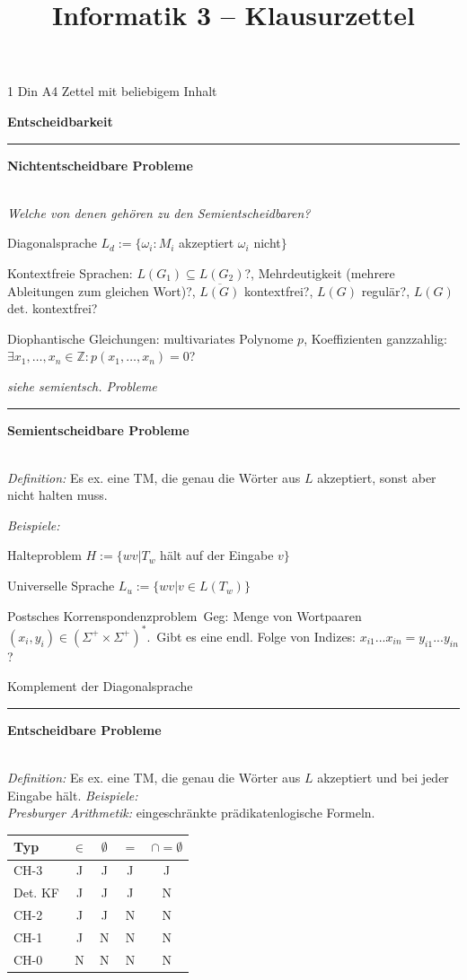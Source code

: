 \documentclass{article}
\title{Informatik 3 -- Klausurzettel}
\newcommand{\h}[1]{\vspace{1ex}\begin{center}\small\textbf{#1}\end{center}}
\newcommand{\hh}[1]{{\vspace{1pt}\hrule\vspace{1pt} \noindent\textbf{#1}}\\}
\newcommand{\hhh}[1]{{\vspace{1pt}\noindent\emph{#1:}}}
\newenvironment{tightlist}{
\begin{list}{\textbullet}{
\setlength{\topsep}{-1ex}
\setlength{\itemsep}{-1ex}
\setlength{\leftmargin}{4ex}
}
}{
\end{list}
\vspace{1ex}
}
\newcommand{\FM}[1]{{\color{red}\emph{#1}}}
\begin{document}
\begin{center} 1 Din A4 Zettel mit beliebigem Inhalt\end{center}

\begin{multicols}{4}
\scriptsize\raggedright

\setlength{\parskip}{0pt}

\h{Entscheidbarkeit}
\hh{Nichtentscheidbare Probleme}
\FM{Welche von denen gehören zu den Semientscheidbaren?}
\begin{tightlist}
\item Diagonalsprache
	$L_d:=\{\omega_i: M_i$ akzeptiert $\omega_i$ nicht$\}$
\item Kontextfreie Sprachen:
$L(G_1) \subseteq L(G_2)$?,
Mehrdeutigkeit (mehrere Ableitungen zum gleichen Wort)?,
$\overline{L(G)}$ kontextfrei?,
$L(G)$ regulär?,
$L(G)$ det. kontextfrei?
\item Diophantische Gleichungen: multivariates Polynome $p$, Koeffizienten ganzzahlig: $\exists x_1, \ldots, x_n\in\mathbb{Z}:p(x_1, \ldots, x_n)=0$?
\item \emph{siehe semientsch. Probleme}
\end{tightlist}


\hh{Semientscheidbare Probleme}
\hhh{Definition} Es ex. eine TM, die genau die Wörter aus $L$ akzeptiert, sonst aber nicht halten muss.

\hhh{Beispiele}
\begin{tightlist}
\item Halteproblem 
	$H:=\{wv | T_w$ hält auf der Eingabe $v\}$
\item Universelle Sprache
	$L_u:=\{wv| v\in L(T_w)\}$
\item Postsches Korrenspondenzproblem\ Geg: Menge von Wortpaaren $(x_i , y_i) \in (\Sigma^+ \times \Sigma^+)^*$.\ Gibt es eine endl. Folge von Indizes: $x_{i1} ... x_{in}=y_{i1}... y_{in}$?
\item Komplement der Diagonalsprache
\end{tightlist}


\hh{Entscheidbare Probleme}
\hhh{Definition} Es ex. eine TM, die genau die Wörter aus $L$ akzeptiert und bei jeder Eingabe hält.
\hhh{Beispiele}\\
\hhh{Presburger Arithmetik} eingeschränkte prädikatenlogische Formeln.\\
\begin{tabular}{l|c|c|c|c}
Typ & $\in$ & $\emptyset$ & $=$ &$\cap=\emptyset$ \\
\hline
CH-3 & J & J & J & J \\
Det. KF & J & J & J & N \\
CH-2& J & J & N & N \\
CH-1& J & N & N & N \\
CH-0& N & N & N & N  
\end{tabular}



\end{multicols}
\end{document}
